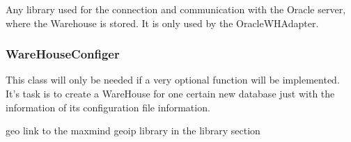 Any library used for the connection and communication with the Oracle server, 
where the Warehouse is stored. It is only used by the OracleWHAdapter.



\subsubsection*{WareHouseConfiger}

This class will only be needed if a very optional function will be implemented. It's task is to create
a WareHouse for one certain new database just with the information of its configuration file information.



geo
 link to the maxmind geoip library in the library section
